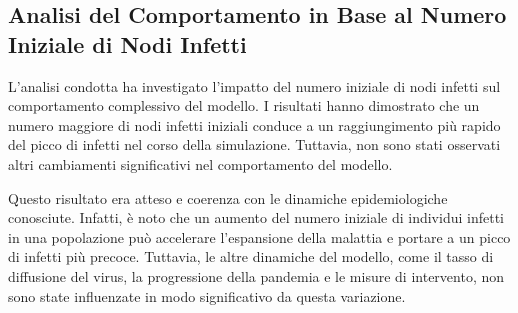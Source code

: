 \subsection{Analisi del Comportamento in Base al Numero Iniziale di Nodi Infetti}

L'analisi condotta ha investigato l'impatto del numero iniziale di 
nodi infetti sul comportamento complessivo del modello. 
I risultati hanno dimostrato che un numero maggiore di nodi infetti 
iniziali conduce a un raggiungimento più rapido del picco di infetti 
nel corso della simulazione. Tuttavia, non sono stati osservati altri 
cambiamenti significativi nel comportamento del modello.

Questo risultato era atteso e coerenza con le dinamiche epidemiologiche 
conosciute. Infatti, è noto che un aumento del numero iniziale di 
individui infetti in una popolazione può accelerare l'espansione della 
malattia e portare a un picco di infetti più precoce. 
Tuttavia, le altre dinamiche del modello, come il tasso di diffusione 
del virus, la progressione della pandemia e le misure di intervento, 
non sono state influenzate in modo significativo da questa variazione.

